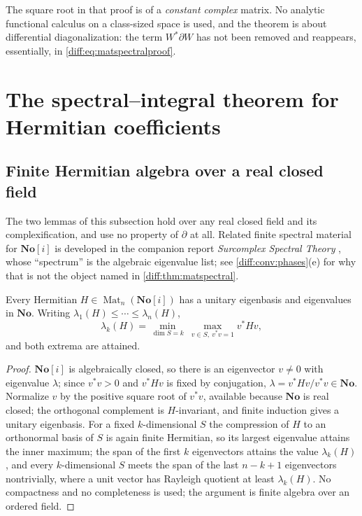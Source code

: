 \documentclass[11pt,letterpaper]{article}
\numberwithin{equation}{section}
\theoremstyle{definition}
\theoremstyle{remark}
\newcommand{\No}{\mathbf{No}}
\newcommand{\SC}{\mathbf{No}[i]}
\newcommand{\der}{\partial}
\newcommand{\Mat}{\operatorname{Mat}}
\begin{document}
The square root in that proof is of a \emph{constant complex} matrix. No
analytic functional calculus on a class-sized space is used, and the theorem
is about differential diagonalization: the term $W^{*}\der W$ has not been
removed and reappears, essentially, in \cref{diff:eq:matspectralproof}.

\section{The spectral--integral theorem for Hermitian coefficients}
\label{diff:sec:matspectral}

\subsection{Finite Hermitian algebra over a real closed field}
\label{diff:sub:matweyl}

The two lemmas of this subsection hold over any real closed field and its
complexification, and use no property of $\der$ at all. Related finite
spectral material for $\SC$ is developed in the companion report
\emph{Surcomplex Spectral Theory} \cite{RepoSpectral}, whose ``spectrum'' is
the algebraic eigenvalue list; see \cref{diff:conv:phases}(e) for why that is
not the object named in \cref{diff:thm:matspectral}.

\begin{lemma}
\label{diff:lem:matminmax}
Every Hermitian $H\in\Mat_{n}(\SC)$ has a unitary eigenbasis and eigenvalues
in $\No$. Writing $\lambda_{1}(H)\leq\cdots\leq\lambda_{n}(H)$,
\begin{equation}\label{diff:eq:matminmax}
 \lambda_{k}(H)=\min_{\dim S=k}\ \max_{v\in S,\ v^{*}v=1}v^{*}Hv ,
\end{equation}
and both extrema are attained.
\end{lemma}
\begin{proof}
$\SC$ is algebraically closed, so there is an eigenvector $v\neq0$ with
eigenvalue $\lambda$; since $v^{*}v>0$ and $v^{*}Hv$ is fixed by conjugation,
$\lambda=v^{*}Hv/v^{*}v\in\No$. Normalize $v$ by the positive square root of
$v^{*}v$, available because $\No$ is real closed; the orthogonal complement is
$H$-invariant, and finite induction gives a unitary eigenbasis. For a fixed
$k$-dimensional $S$ the compression of $H$ to an orthonormal basis of $S$ is
again finite Hermitian, so its largest eigenvalue attains the inner maximum;
the span of the first $k$ eigenvectors attains the value $\lambda_{k}(H)$, and
every $k$-dimensional $S$ meets the span of the last $n-k+1$ eigenvectors
nontrivially, where a unit vector has Rayleigh quotient at least
$\lambda_{k}(H)$. No compactness and no completeness is used; the argument is
finite algebra over an ordered field.
\end{proof}
\end{document}
